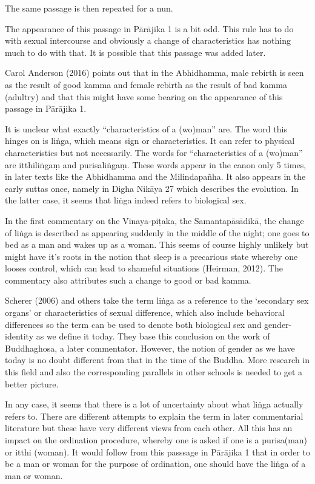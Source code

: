 The same passage is then repeated for a nun.

The appearance of this passage in Pārājika 1 is a bit odd. This rule has to do with sexual intercourse and obviously a change of characteristics has nothing much to do with that. It is possible that this passage was added later.

Carol Anderson (2016) points out that in the Abhidhamma, male rebirth is seen as the result of good kamma and female rebirth as the result of bad kamma (adultry) and that this might have some bearing on the appearance of this passage in Pārājika 1.

It is unclear what exactly “characteristics of a (wo)man” are. The word this hinges on is liṅga, which means sign or characteristics. It can refer to physical characteristics but not necessarily. The words for “characteristics of a (wo)man” are itthiliṅgaṃ and purisaliṅgaṃ. These words appear in the canon only 5 times, in later texts like the Abhidhamma and the Milindapañha. It also appears in the early suttas once, namely in Digha Nikāya 27 which describes the evolution. In the latter case, it seems that liṅga indeed refers to biological sex.

In the first commentary on the Vinaya-piṭaka, the Samantapāsādikā, the change of liṅga is described as appearing suddenly in the middle of the night; one goes to bed as a man and wakes up as a woman. This seems of course highly unlikely but might have it’s roots in the notion that sleep is a precarious state whereby one looses control, which can lead to shameful situations (Heirman, 2012). The commentary also attributes such a change to good or bad kamma.

Scherer (2006) and others take the term liṅga as a reference to the ‘secondary sex organs’ or characteristics of sexual difference, which also include behavioral differences so the term can be used to denote both biological sex and gender-identity as we define it today. They base this conclusion on the work of Buddhaghosa, a later commentator. However, the notion of gender as we have today is no doubt different from that in the time of the Buddha. More research in this field and also the corresponding parallels in other schools is needed to get a better picture.

In any case, it seems that there is a lot of uncertainty about what liṅga actually refers to. There are different attempts to explain the term in later commentarial literature but these have very different views from each other. All this has an impact on the ordination procedure, whereby one is asked if one is a purisa(man) or itthi (woman). It would follow from this passsage in Pārājika 1 that in order to be a man or woman for the purpose of ordination, one should have the liṅga of a man or woman.

